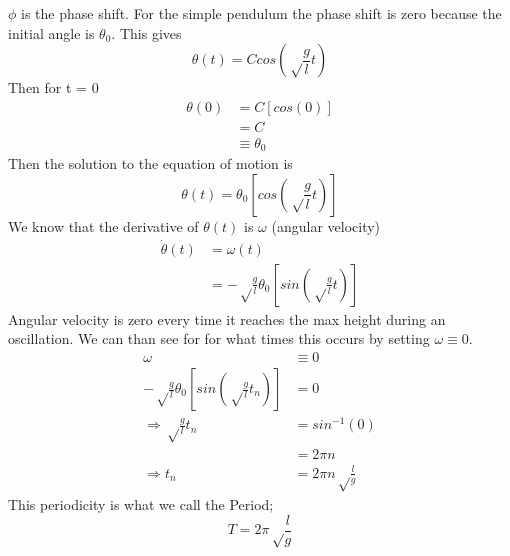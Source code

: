 \documentclass[iop]{emulateapj}
\begin{document}
$\phi$ is the phase shift. For the simple pendulum the phase shift is zero 
because the initial angle is $\theta_0$. This gives\\
\begin{equation*}
\theta(t) = Ccos(\sqrt\frac{g}{l}t)
\end{equation*}
Then for t = 0
\begin{align*}
\theta(0) & = C[cos(0)]\\
& = C\\
& \equiv \theta_0
\end{align*}
Then the solution to the equation of motion is
\begin{equation}
\boxed{\theta(t) = \theta_0[cos(\sqrt\frac{g}{l}t)]}
\end{equation}
We know that the derivative of $\theta(t)$ is $\omega$ (angular velocity)
\begin{align*}
\dot{\theta}(t) & = \omega(t)\\
& = -\sqrt\frac{g}{l}\theta_0[sin(\sqrt\frac{g}{l}t)]
\end{align*}
Angular velocity is zero every time it reaches the max height during an oscillation. We can than see for
for what times this occurs by setting $\omega \equiv 0$.
\begin{align*}
\omega & \equiv 0\\
-\sqrt\frac{g}{l}\theta_0[sin(\sqrt\frac{g}{l}t_n)] & = 0\\
\Rightarrow \sqrt\frac{g}{l}t_n & = sin^{-1}(0)\\
& = 2\pi n\\
\Rightarrow t_n & = 2\pi n\sqrt\frac{l}{g}
\end{align*}
This periodicity is what we call the Period;
\begin{equation}
\boxed{T = 2\pi \sqrt\frac{l}{g}}
\end{equation}
\end{document}
